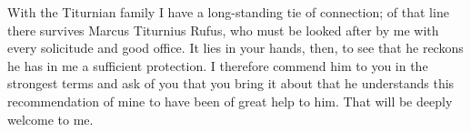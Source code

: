 

 With the Titurnian family I have a long-standing tie of connection; of that line there survives Marcus Titurnius Rufus, who must be looked after by me with every solicitude and good office. It lies in your hands, then, to see that he reckons he has in me a sufficient protection. I therefore commend him to you in the strongest terms and ask of you that you bring it about that he understands this recommendation of mine to have been of great help to him. That will be deeply welcome to me.
